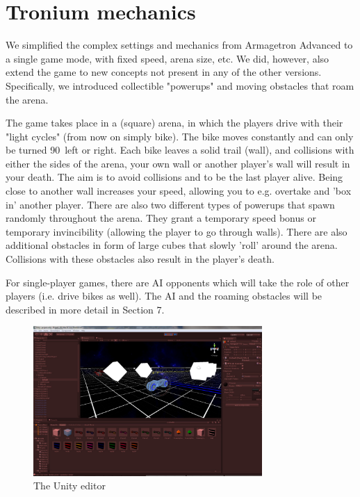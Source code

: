 \documentclass{report}
\begin{document}
 
 \section{Tronium mechanics }
We simplified the complex settings and mechanics from Armagetron Advanced to a single game mode, with fixed speed, arena size, etc.
We did, however, also extend the game to new concepts not present in any of the other versions. Specifically, we introduced collectible "powerups" and moving obstacles that roam the arena.

The game takes place in a (square) arena, in which the players drive with their "light cycles" (from now on simply bike).
The bike moves constantly and can only be turned 90\textdegree \ left or right.
Each bike leaves a solid trail (wall), and collisions with either the sides of the arena, your own wall or another player's wall will result in your death.
The aim is to avoid collisions and to be the last player alive.
Being close to another wall increases your speed, allowing you to e.g. overtake and 'box in' another player.
There are also two different types of powerups that spawn randomly throughout the arena. 
They grant a temporary speed bonus or temporary invincibility (allowing the player to go through walls).
There are also additional obstacles in form of large cubes that slowly 'roll' around the arena. Collisions with these obstacles also result in the player's death. 

For single-player games, there are AI opponents which will take the role of other players (i.e. drive bikes as well).
The AI and the roaming obstacles will be described in more detail in Section 7.
\begin{figure}
\center 	 	    \includegraphics[height=5.7cm]{editor_cropped}
 	   	 	\caption{The Unity editor}
 \end{figure}
\end{document}
